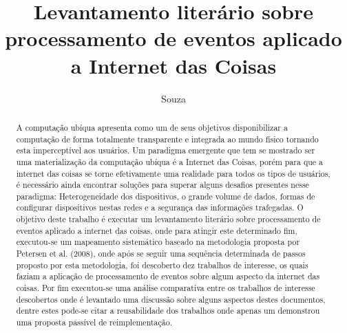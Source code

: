 \documentclass[ti,table]{texufpel} %
\title{Levantamento literário sobre processamento de eventos aplicado a Internet das Coisas}
\author{Souza}{Weslen Schiavon}
\begin{document}
\renewcommand{\coadvisorname}{Coorientadora}      %

\maketitle 

\sloppy



\begin{abstract}
A computação ubíqua apresenta como um de seus objetivos  disponibilizar a computação de forma totalmente transparente e integrada ao mundo físico tornando esta imperceptível aos usuários. Um paradigma emergente que tem se mostrado ser uma materialização da computação ubíqua é a Internet das Coisas, porém para que a internet das coisas se torne efetivamente uma realidade para todos os tipos de usuários, é necessário ainda encontrar soluções para superar alguns desafios presentes nesse paradigma: Heterogeneidade dos dispositivos, o grande volume de dados, formas de configurar dispositivos nestas redes e a segurança das informações trafegadas. O objetivo deste trabalho é executar um levantamento literário sobre processamento de eventos aplicado a internet das coisas, onde para atingir este determinado fim, executou-se um mapeamento sistemático baseado na metodologia proposta por Petersen et al. (2008), onde após se seguir uma sequência determinada de passos proposto por esta metodologia, foi descoberto dez trabalhos de interesse, os quais faziam a aplicação de processamento de eventos sobre algum aspecto da internet das coisas. Por fim executou-se uma análise comparativa entre os trabalhos de interesse descobertos onde é levantado uma discussão sobre alguns aspectos destes documentos, dentre estes pode-se citar a reusabilidade dos trabalhos onde apenas um demonstrou uma proposta passível de reimplementação.
\end{abstract}
\end{document}
